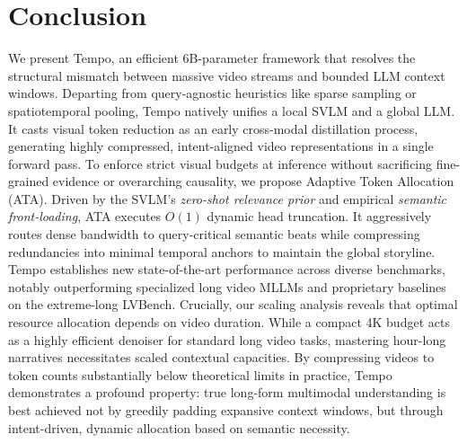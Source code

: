 \section{Conclusion}
\label{sec:conclusion}
We present Tempo, an efficient 6B-parameter framework that resolves the structural mismatch between massive video streams and bounded LLM context windows. Departing from query-agnostic heuristics like sparse sampling or spatiotemporal pooling, Tempo natively unifies a local SVLM and a global LLM. It casts visual token reduction as an early cross-modal distillation process, generating highly compressed, intent-aligned video representations in a single forward pass.
%
To enforce strict visual budgets at inference without sacrificing fine-grained evidence or overarching causality, we propose Adaptive Token Allocation (ATA). Driven by the SVLM's \emph{zero-shot relevance prior} and empirical \emph{semantic front-loading}, ATA executes $O(1)$ dynamic head truncation. It aggressively routes dense bandwidth to query-critical semantic beats while compressing redundancies into minimal temporal anchors to maintain the global storyline.
%
Tempo establishes new state-of-the-art performance across diverse benchmarks, notably outperforming specialized long video MLLMs and proprietary baselines on the extreme-long LVBench. Crucially, our scaling analysis reveals that optimal resource allocation depends on video duration. While a compact 4K budget acts as a highly efficient denoiser for standard long video tasks, mastering hour-long narratives necessitates scaled contextual capacities.
%
By compressing videos to token counts substantially below theoretical limits in practice, Tempo demonstrates a profound property: true long-form multimodal understanding is best achieved not by greedily padding expansive context windows, but through intent-driven, dynamic allocation based on semantic necessity.
